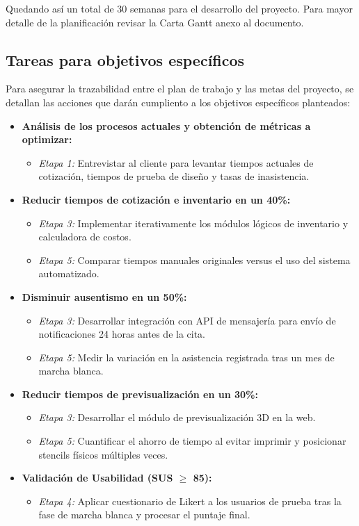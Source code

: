 Quedando así un total de 30 semanas para el desarrollo del proyecto. Para mayor detalle de la planificación revisar la Carta Gantt anexo al documento.

\subsection{Tareas para objetivos específicos}

Para asegurar la trazabilidad entre el plan de trabajo y las metas del proyecto, se detallan las acciones que darán cumpliento a los objetivos específicos planteados:

\begin{itemize}
  \item \textbf{Análisis de los procesos actuales y obtención de métricas a optimizar:}
  \begin{itemize}
    \item \textit{Etapa 1:} Entrevistar al cliente para levantar tiempos actuales de cotización, tiempos de prueba de diseño y tasas de inasistencia.
  \end{itemize}
  \item \textbf{Reducir tiempos de cotización e inventario en un 40\%:}
  \begin{itemize}
    \item \textit{Etapa 3:} Implementar iterativamente los módulos lógicos de inventario y calculadora de costos.
    \item \textit{Etapa 5:} Comparar tiempos manuales originales versus el uso del sistema automatizado.
  \end{itemize}
  \item \textbf{Disminuir ausentismo en un 50\%:}
  \begin{itemize}
    \item \textit{Etapa 3:} Desarrollar integración con API de mensajería para envío de notificaciones 24 horas antes de la cita.
    \item \textit{Etapa 5:} Medir la variación en la asistencia registrada tras un mes de marcha blanca.
  \end{itemize}
  \item \textbf{Reducir tiempos de previsualización en un 30\%:}
  \begin{itemize}
    \item \textit{Etapa 3:} Desarrollar el módulo de previsualización 3D en la web.
    \item \textit{Etapa 5:} Cuantificar el ahorro de tiempo al evitar imprimir y posicionar stencils físicos múltiples veces.
  \end{itemize}
  \item \textbf{Validación de Usabilidad (SUS $\geq$ 85):}
  \begin{itemize}
    \item \textit{Etapa 4:} Aplicar cuestionario de Likert a los usuarios de prueba tras la fase de marcha blanca y procesar el puntaje final.
  \end{itemize}
\end{itemize}

